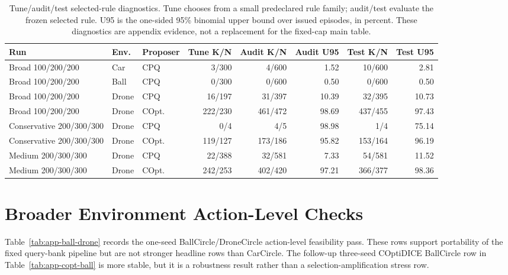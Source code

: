 \documentclass[letterpaper]{article}
\begin{document}
\begin{table}[t]
\centering
\scriptsize
\setlength{\tabcolsep}{3.5pt}
\begin{tabular}{lllrrrrr}
\toprule
Run & Env. & Proposer & Tune K/N & Audit K/N & Audit U95 & Test K/N & Test U95 \\
\midrule
Broad 100/200/200 & Car & CPQ & 3/300 & 4/600 & 1.52 & 10/600 & 2.81 \\
Broad 100/200/200 & Ball & CPQ & 0/300 & 0/600 & 0.50 & 0/600 & 0.50 \\
Broad 100/200/200 & Drone & CPQ & 16/197 & 31/397 & 10.39 & 32/395 & 10.73 \\
Broad 100/200/200 & Drone & COpt. & 222/230 & 461/472 & 98.69 & 437/455 & 97.43 \\
\midrule
Conservative 200/300/300 & Drone & CPQ & 0/4 & 4/5 & 98.98 & 1/4 & 75.14 \\
Conservative 200/300/300 & Drone & COpt. & 119/127 & 173/186 & 95.82 & 153/164 & 96.19 \\
Medium 200/300/300 & Drone & CPQ & 22/388 & 32/581 & 7.33 & 54/581 & 11.52 \\
Medium 200/300/300 & Drone & COpt. & 242/253 & 402/420 & 97.21 & 366/377 & 98.36 \\
\bottomrule
\end{tabular}
\caption{Tune/audit/test selected-rule diagnostics. Tune chooses from a small
predeclared rule family; audit/test evaluate the frozen selected rule. U95 is
the one-sided 95\% binomial upper bound over issued episodes, in percent. These
diagnostics are appendix evidence, not a replacement for the fixed-cap main
table.}
\label{tab:app-tuned-rules}
\end{table}

\section{Broader Environment Action-Level Checks}

Table~\ref{tab:app-ball-drone} records the one-seed BallCircle/DroneCircle
action-level feasibility pass. These rows support portability of the fixed
query-bank pipeline but are not stronger headline rows than CarCircle. The
follow-up three-seed COptiDICE BallCircle row in
Table~\ref{tab:app-copt-ball} is more stable, but it is a robustness result
rather than a selection-amplification stress row.
\end{document}
